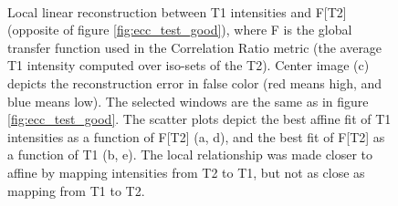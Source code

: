 \begin{figure}[t]
\centering
    \\
    \caption{Local linear reconstruction between T1 intensities and F[T2] (opposite of figure \ref{fig:ecc_test_good}), where F is the global transfer function used in the Correlation Ratio metric (the average T1 intensity computed over iso-sets of the T2). Center image (c) depicts the reconstruction error in false color (red means high, and blue means low). The selected windows are the same as in figure \ref{fig:ecc_test_good}. The scatter plots depict the best affine fit of T1 intensities as a function of F[T2] (a, d), and the best fit of F[T2] as a function of T1 (b, e). The local relationship was made closer to affine by mapping intensities from T2 to T1, but not as close as mapping from T1 to T2.}
\label{fig:ecc_test_bad}
\end{figure}

